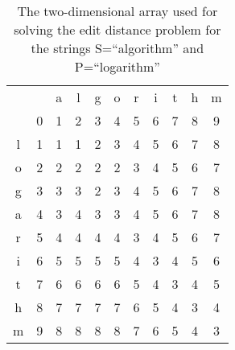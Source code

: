 \documentclass[thesis.tex]{subfiles}
\begin{document}
\begin{table}[!b]
    \begin{tabularx}{0.65\textwidth}{ccccccccccc}
      &&a&l&g&o&r&i&t&h&m \\ \cline{2-11}
      &\multicolumn{1}{|c|}{0}&1&\multicolumn{1}{|c|}{2}&3&\multicolumn{1}{|c|}{4}&5&\multicolumn{1}{|c|}{6}&7&\multicolumn{1}{|c|}{8}&\multicolumn{1}{c|}{9}\\ \cline{2-11}
      l &\multicolumn{1}{|c|}{1}&1&\multicolumn{1}{|c|}{1}&2&\multicolumn{1}{|c|}{3}&4&\multicolumn{1}{|c|}{5}&6&\multicolumn{1}{|c|}{7}&\multicolumn{1}{c|}{8}\\ \cline{2-11}
      o &\multicolumn{1}{|c|}{2}&2&\multicolumn{1}{|c|}{2}&2&\multicolumn{1}{|c|}{2}&3&\multicolumn{1}{|c|}{4}&5&\multicolumn{1}{|c|}{6}&\multicolumn{1}{c|}{7}\\ \cline{2-11}
      g &\multicolumn{1}{|c|}{3}&3&\multicolumn{1}{|c|}{3}&2&\multicolumn{1}{|c|}{3}&4&\multicolumn{1}{|c|}{5}&6&\multicolumn{1}{|c|}{7}&\multicolumn{1}{c|}{8}\\ \cline{2-11}
      a &\multicolumn{1}{|c|}{4}&3&\multicolumn{1}{|c|}{4}&3&\multicolumn{1}{|c|}{3}&4&\multicolumn{1}{|c|}{5}&6&\multicolumn{1}{|c|}{7}&\multicolumn{1}{c|}{8}\\ \cline{2-11}
      r &\multicolumn{1}{|c|}{5}&4&\multicolumn{1}{|c|}{4}&4&\multicolumn{1}{|c|}{4}&3&\multicolumn{1}{|c|}{4}&5&\multicolumn{1}{|c|}{6}&\multicolumn{1}{c|}{7}\\ \cline{2-11}
      i &\multicolumn{1}{|c|}{6}&5&\multicolumn{1}{|c|}{5}&5&\multicolumn{1}{|c|}{5}&4&\multicolumn{1}{|c|}{3}&4&\multicolumn{1}{|c|}{5}&\multicolumn{1}{c|}{6}\\ \cline{2-11}
      t &\multicolumn{1}{|c|}{7}&6&\multicolumn{1}{|c|}{6}&6&\multicolumn{1}{|c|}{6}&5&\multicolumn{1}{|c|}{4}&3&\multicolumn{1}{|c|}{4}&\multicolumn{1}{c|}{5}\\ \cline{2-11}
      h &\multicolumn{1}{|c|}{8}&7&\multicolumn{1}{|c|}{7}&7&\multicolumn{1}{|c|}{7}&6&\multicolumn{1}{|c|}{5}&4&\multicolumn{1}{|c|}{3}&\multicolumn{1}{c|}{4}\\ \cline{2-11}
      m &\multicolumn{1}{|c|}{9}&8&\multicolumn{1}{|c|}{8}&8&\multicolumn{1}{|c|}{8}&7&\multicolumn{1}{|c|}{6}&5&\multicolumn{1}{|c|}{4}&\multicolumn{1}{c|}{3}\\ \cline{2-11}
    \end{tabularx}
  \caption[An array used to solve the edit distance problem]{The two-dimensional array used for solving the edit distance problem for the strings S=``algorithm'' and P=``logarithm''}
  \label{fig:edit_distance_array}
\end{table}\\
\end{document}
